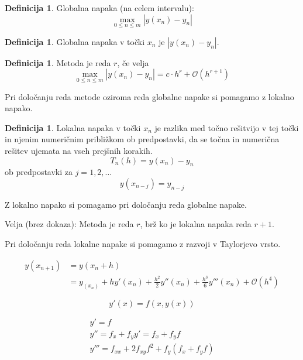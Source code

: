 \documentclass[a4paper,12pt]{article}
\theoremstyle{definition}
\newtheorem{defn}[counter]{Definicija}
\theoremstyle{remark}
\begin{document}
\begin{defn}
    Globalna napaka (na celem intervalu):
    \begin{equation*}
        \max_{0 \leq n \leq m} |y(x_n) - y_n|
    \end{equation*}
\end{defn}

\begin{defn}
    Globalna napaka v točki $x_n$ je $|y(x_n) - y_n|$.
\end{defn}

\begin{defn}
    Metoda je reda $r$, če velja
    \begin{equation*}
        \max_{0 \leq n \leq m} |y(x_n) - y_n| = c \cdot h^r + \mathcal{O} (h^{r+1})
    \end{equation*}
\end{defn}

Pri določanju reda metode oziroma reda globalne napake si pomagamo z lokalno napako.

\begin{defn}
    Lokalna napaka v točki $x_n$ je razlika med točno rešitvijo v tej točki in njenim numeričnim približkom ob predpostavki,
    da se točna in numerična rešitev ujemata na vseh prejšnih korakih.
    \begin{equation*}
        T_n(h) = y(x_n) - y_n
    \end{equation*}
    ob predpostavki za $j = 1, 2, \dots$
    \begin{equation*}
        y(x_{n-j}) = y_{n-j}
    \end{equation*}
\end{defn}

Z lokalno napako si pomagamo pri določanju reda globalne napake.

Velja (brez dokaza): Metoda je reda $r$, brž ko je lokalna napaka reda $r+1$.

Pri določanju reda lokalne napake si pomagamo z razvoji v Taylorjevo vrsto.

\begin{align*}
    y(x_{n+1}) &= y(x_n + h) \\
               &= y_(x_n) + h y'(x_n) + \frac{h^2}{2} y''(x_n) + \frac{h^3}{6} y'''(x_n) + \mathcal{O}(h^4)
\end{align*}

\begin{equation*}
    y'(x) = f(x, y(x))
\end{equation*}

\begin{gather*}
    y' = f \\
    y'' = f_x + f_y y' = f_x + f_yf \\
    y''' = f_{xx} + 2 f_{xy} f^2 + f_y(f_x + f_y f)
\end{gather*}
\end{document}
